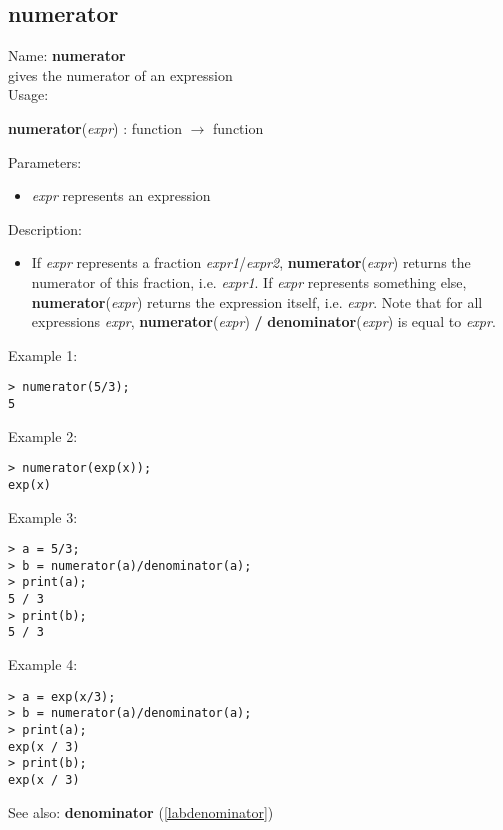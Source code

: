 \subsection{numerator}
\label{labnumerator}
\noindent Name: \textbf{numerator}\\
gives the numerator of an expression\\

\noindent Usage: 
\begin{center}
\textbf{numerator}(\emph{expr}) : \textsf{function} $\rightarrow$ \textsf{function}\\
\end{center}
Parameters: 
\begin{itemize}
\item \emph{expr} represents an expression
\end{itemize}
\noindent Description: \begin{itemize}

\item If \emph{expr} represents a fraction \emph{expr1}/\emph{expr2}, \textbf{numerator}(\emph{expr})
   returns the numerator of this fraction, i.e. \emph{expr1}.
   If \emph{expr} represents something else, \textbf{numerator}(\emph{expr}) 
   returns the expression itself, i.e. \emph{expr}.
   Note that for all expressions \emph{expr}, \textbf{numerator}(\emph{expr}) \textbf{/} \textbf{denominator}(\emph{expr})
   is equal to \emph{expr}.
\end{itemize}
\noindent Example 1: 
\begin{center}\begin{minipage}{15cm}\begin{Verbatim}[frame=single]
> numerator(5/3);
5
\end{Verbatim}
\end{minipage}\end{center}
\noindent Example 2: 
\begin{center}\begin{minipage}{15cm}\begin{Verbatim}[frame=single]
> numerator(exp(x));
exp(x)
\end{Verbatim}
\end{minipage}\end{center}
\noindent Example 3: 
\begin{center}\begin{minipage}{15cm}\begin{Verbatim}[frame=single]
> a = 5/3;
> b = numerator(a)/denominator(a);
> print(a);
5 / 3
> print(b);
5 / 3
\end{Verbatim}
\end{minipage}\end{center}
\noindent Example 4: 
\begin{center}\begin{minipage}{15cm}\begin{Verbatim}[frame=single]
> a = exp(x/3);
> b = numerator(a)/denominator(a);
> print(a);
exp(x / 3)
> print(b);
exp(x / 3)
\end{Verbatim}
\end{minipage}\end{center}
See also: \textbf{denominator} (\ref{labdenominator})
